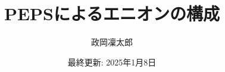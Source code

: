 \documentclass[12pt]{ltjsarticle}
\newcommand{\∩}[1]{
  \vcenter{\hbox{\scriptsize$#1$}}
}
\numberwithin{equation}{section}
\begin{document}
\title{PEPSによるエニオンの構成}
\author{政岡凜太郎}
\date{最終更新: 2025年1月8日}
\maketitle

\tableofcontents
\newpage

\newpage

\newpage

\newpage

% 
\newpage
\appendix
\def\thesection{\Alph{section}}

\newpage
\printbibliography
\end{document}
